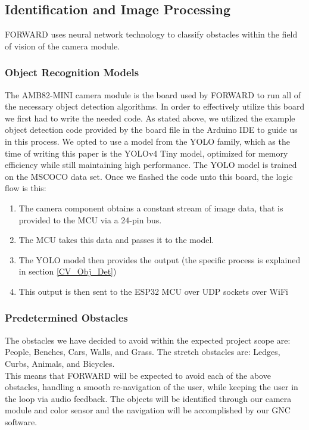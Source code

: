 \subsection{Identification and Image Processing}
\noindent FORWARD uses neural network technology to classify obstacles within the field of vision of the camera module.

\subsubsection{Object Recognition Models}
\noindent The AMB82-MINI camera module is the board used by FORWARD to run all of the necessary object detection algorithms. In order to effectively utilize this board we first had to write the needed code. As stated above, we utilized the example object detection code provided by the board file in the Arduino IDE to guide us in this process. We opted to use a model from the YOLO family, which as the time of writing this paper is the YOLOv4 Tiny model, optimized for memory efficiency while still maintaining high performance. The YOLO model is trained on the MSCOCO data set. Once we flashed the code unto this board, the logic flow is this: 

\begin{enumerate}
	\item The camera component obtains a constant stream of image data, that is provided to the MCU via a 24-pin bus.
	\item The MCU takes this data and passes it to the model.
	\item The YOLO model then provides the output (the specific process is explained in section \ref{CV_Obj_Det})
	\item This output is then sent to the ESP32 MCU over UDP sockets over WiFi
\end{enumerate}

\subsubsection{Predetermined Obstacles}
\noindent The obstacles we have decided to avoid within the expected project scope are: People, Benches, Cars, Walls, and Grass. The stretch obstacles are: Ledges, Curbs, Animals, and Bicycles.\\

\noindent This means that FORWARD will be expected to avoid each of the above obstacles, handling a smooth re-navigation of the user, while keeping the user in the loop via audio feedback. The objects will be identified through our camera module and color sensor and the navigation will be accomplished by our GNC software.